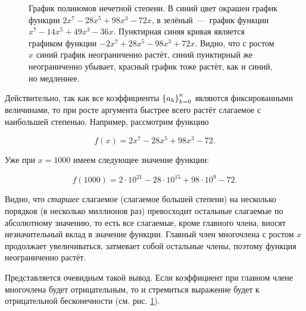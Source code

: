 \documentclass[12pt]{article}
\begin{document}
\begin{figure}[htbp]
  \label{fig:1}
	\centering
	\caption{График полиномов нечетной степени. В синий цвет окрашен график функции $2x^{7} - 28 x^{5} + 98 x^{3} - 72 x$, в зелёный~\----~график функции $x^{7} - 14 x^{5} + 49 x^{3} - 36 x$. Пунктирная синяя кривая является графиком функции $-2x^{7} + 28 x^{5} -98 x^{3} + 72 x$. Видно, что с ростом $x$ синий график неограниченно растёт, синий пунктирный же неограниченно убывает, красный график тоже растёт, как и синий, но медленнее.}
\end{figure}

Действительно, так как все коэффициенты $\qty{a_k}_{k=0}^n$ являются фиксированными величинами, то при росте аргумента быстрее всего растёт слагаемое с наибольшей степенью. Например, рассмотрим функцию

\begin{equation}
f(x)=2x^{7} - 28 x^{5} + 98 x^{3} - 72.
\end{equation}

Уже при $x = 1000$ имеем следующее значение функции:

\begin{equation}
f(1000) = 2 \cdot 10^{21} - 28 \cdot 10^{15} + 98 \cdot 10^9 - 72.
\end{equation}

Видно, что \emph{старшее} слагаемое (слагаемое большей степени) на несколько порядков (в несколько миллионов раз) превосходит остальные слагаемые по абсолютному значению, то есть все слагаемые, кроме главного члена, вносят незначительный вклад в значение функции. Главный член многочлена с ростом $x$ продолжает увеличиваться, затмевает собой остальные члены, поэтому функция неограниченно растёт.

\par
Представляется очевидным такой вывод. Если коэффициент при главном члене многочлена будет отрицательным, то и стремиться выражение будет к отрицательной бесконечности (см. рис. \ref{fig:1}).
\end{document}
